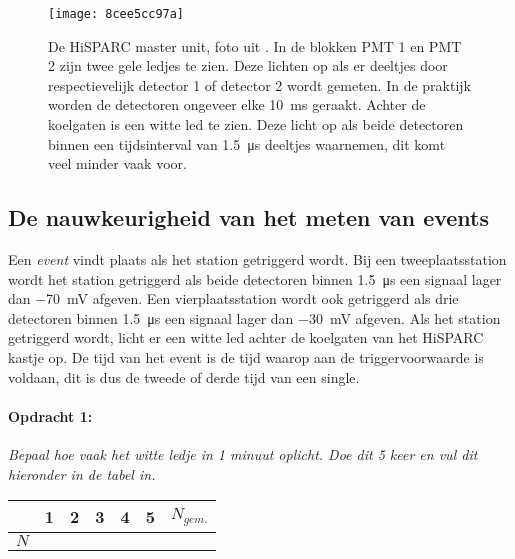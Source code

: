\begin{figure}[ht]
    \centering
    \texttt{[image: 8cee5cc97a]}
    \caption{De HiSPARC master unit, foto uit \cite{nikhefhisparc}. In de
             blokken PMT 1 en PMT 2 zijn twee gele ledjes te zien. Deze
             lichten op als er deeltjes door respectievelijk detector 1
             of detector 2 wordt gemeten. In de praktijk worden de
             detectoren ongeveer elke \SI{10}{\milli\second} geraakt.
             Achter de koelgaten is een witte led te zien. Deze licht op
             als beide detectoren binnen een tijdsinterval van
             \SI{1.5}{\micro\second} deeltjes waarnemen, dit komt veel
             minder vaak voor.}
\end{figure}


\subsection{De nauwkeurigheid van het meten van events}

Een \emph{event} vindt plaats als het station getriggerd wordt.
Bij een tweeplaatsstation wordt het station getriggerd als beide detectoren
binnen \SI{1,5}{\micro\second} een signaal lager dan \SI{-70}{\milli\volt}
afgeven. Een vierplaatsstation wordt ook getriggerd als drie detectoren
binnen \SI{1,5}{\micro\second} een signaal lager dan \SI{-30}{\milli\volt}
afgeven. Als het station getriggerd wordt, licht er een witte led
achter de koelgaten van het HiSPARC kastje op. De tijd van het event
is de tijd waarop aan de triggervoorwaarde is voldaan, dit is dus
de tweede of derde tijd van een single.

\begin{minipage}[t]{1\columnwidth}%

\paragraph{Opdracht 1:}

\textit{Bepaal hoe vaak het witte ledje in 1 minuut oplicht. Doe dit 5 keer
en vul dit hieronder in de tabel in.}

\begin{tabular}{|x{.11\textwidth}|x{.11\textwidth}|x{.11\textwidth}
                |x{.11\textwidth}|x{.11\textwidth}|x{.11\textwidth}
                |x{.11\textwidth}|}
     & 1 & 2 & 3 & 4 & 5 & $N_{gem.}$\\
    \hline 
    $N$ &  &  &  &  &  & \tabularnewline
    \hline 
\end{tabular}%
\end{minipage}

